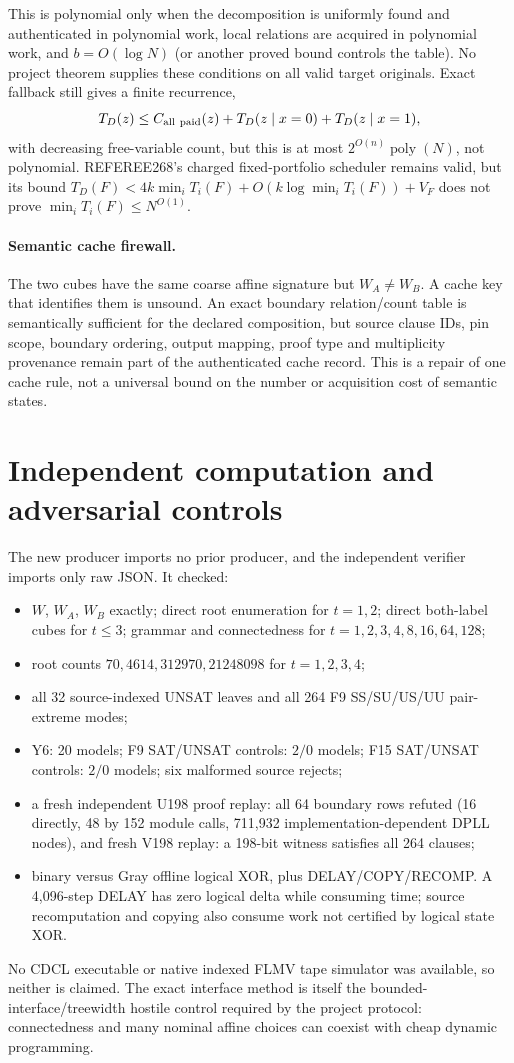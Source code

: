 \documentclass[11pt]{article}
\begin{document}
This is polynomial only when the decomposition is uniformly found and authenticated in polynomial work, local relations are acquired in polynomial work, and $b=O(\log N)$ (or another proved bound controls the table).  No project theorem supplies these conditions on all valid target originals.  Exact fallback still gives a finite recurrence,
\[
 T_D(z)\le C_{\rm all\ paid}(z)+T_D(z\mid x=0)+T_D(z\mid x=1),
\]
with decreasing free-variable count, but this is at most $2^{O(n)}\operatorname{poly}(N)$, not polynomial.  REFEREE268's charged fixed-portfolio scheduler remains valid, but its bound
\(
T_D(F)<4k\min_iT_i(F)+O(k\log\min_iT_i(F))+V_F
\)
does not prove $\min_iT_i(F)\le N^{O(1)}$.

\paragraph{Semantic cache firewall.}
The two cubes have the same coarse affine signature but $W_A\ne W_B$.  A cache key that identifies them is unsound.  An exact boundary relation/count table is semantically sufficient for the declared composition, but source clause IDs, pin scope, boundary ordering, output mapping, proof type and multiplicity provenance remain part of the authenticated cache record.  This is a repair of one cache rule, not a universal bound on the number or acquisition cost of semantic states.

\section{Independent computation and adversarial controls}
The new producer imports no prior producer, and the independent verifier imports only raw JSON.  It checked:
\begin{itemize}
\item $W$, $W_A$, $W_B$ exactly; direct root enumeration for $t=1,2$; direct both-label cubes for $t\le3$; grammar and connectedness for $t=1,2,3,4,8,16,64,128$;
\item root counts $70,4614,312970,21248098$ for $t=1,2,3,4$;
\item all 32 source-indexed UNSAT leaves and all 264 F9 SS/SU/US/UU pair-extreme modes;
\item Y6: 20 models; F9 SAT/UNSAT controls: $2/0$ models; F15 SAT/UNSAT controls: $2/0$ models; six malformed source rejects;
\item a fresh independent U198 proof replay: all 64 boundary rows refuted (16 directly, 48 by 152 module calls, 711,932 implementation-dependent DPLL nodes), and fresh V198 replay: a 198-bit witness satisfies all 264 clauses;
\item binary versus Gray offline logical XOR, plus DELAY/COPY/RECOMP.  A 4,096-step DELAY has zero logical delta while consuming time; source recomputation and copying also consume work not certified by logical state XOR.
\end{itemize}
No CDCL executable or native indexed FLMV tape simulator was available, so neither is claimed.  The exact interface method is itself the bounded-interface/treewidth hostile control required by the project protocol: connectedness and many nominal affine choices can coexist with cheap dynamic programming.
\end{document}
